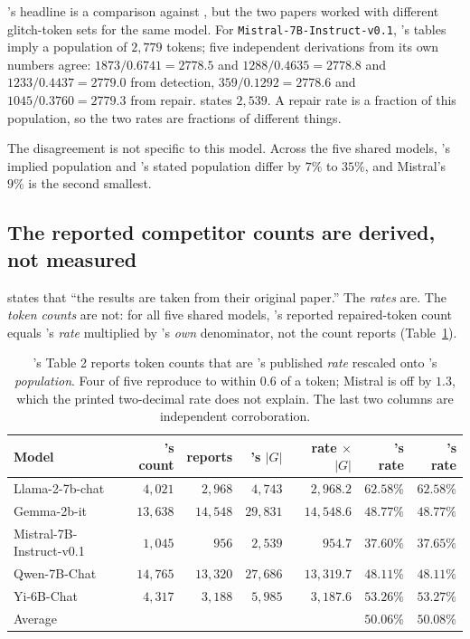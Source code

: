 \gc{}'s headline is a comparison against \gp{}, but the two papers worked with
different glitch-token sets for the same model. For
\texttt{Mistral-7B-Instruct-v0.1}, \gp{}'s tables imply a population of $2{,}779$
tokens; five independent derivations from its own numbers agree:
$1873/0.6741 = 2778.5$ and $1288/0.4635 = 2778.8$ and $1233/0.4437 = 2779.0$ from
detection, $359/0.1292 = 2778.6$ and $1045/0.3760 = 2779.3$ from repair. \gc{}
states $2{,}539$. A repair rate is a fraction of this population, so the two rates
are fractions of different things.

The disagreement is not specific to this model. Across the five shared models,
\gp{}'s implied population and \gc{}'s stated population differ by $7\%$ to
$35\%$, and Mistral's $9\%$ is the second smallest.

\subsection{The reported competitor counts are derived, not measured}
\label{sec:rescale}

\gc{} states that ``the \gp{} results are taken from their original paper.'' The
\emph{rates} are. The \emph{token counts} are not: for all five shared models,
\gc{}'s reported \gp{} repaired-token count equals \gp{}'s \emph{rate} multiplied
by \gc{}'s \emph{own} denominator, not the count \gp{} reports
(Table~\ref{tab:rescale}).

\begin{table}[h]
\centering
\caption{\gc{}'s Table 2 reports \gp{} token counts that are \gp{}'s published
\emph{rate} rescaled onto \gc{}'s \emph{population}. Four of five reproduce to
within $0.6$ of a token; Mistral is off by $1.3$, which the printed two-decimal
rate does not explain. The last two columns are independent corroboration.}
\label{tab:rescale}
\small
\begin{tabular}{lrrrrrr}
\toprule
Model & \gp{}'s count & \gc{} reports & \gc{}'s $|G|$ & \gp{} rate $\times$ \gc{} $|G|$ & \gp{}'s rate & \gc{}'s rate \\
\midrule
Llama-2-7b-chat          & $4{,}021$  & $2{,}968$  & $4{,}743$  & $2{,}968.2$  & $62.58\%$ & $62.58\%$ \\
Gemma-2b-it              & $13{,}638$ & $14{,}548$ & $29{,}831$ & $14{,}548.6$ & $48.77\%$ & $48.77\%$ \\
Mistral-7B-Instruct-v0.1 & $1{,}045$  & $956$      & $2{,}539$  & $954.7$      & $37.60\%$ & $\mathbf{37.65\%}$ \\
Qwen-7B-Chat             & $14{,}765$ & $13{,}320$ & $27{,}686$ & $13{,}319.7$ & $48.11\%$ & $48.11\%$ \\
Yi-6B-Chat               & $4{,}317$  & $3{,}188$  & $5{,}985$  & $3{,}187.6$  & $53.26\%$ & $\mathbf{53.27\%}$ \\
\midrule
Average                  &            &            &            &              & $50.06\%$ & $\mathbf{50.08\%}$ \\
\bottomrule
\end{tabular}
\end{table}

